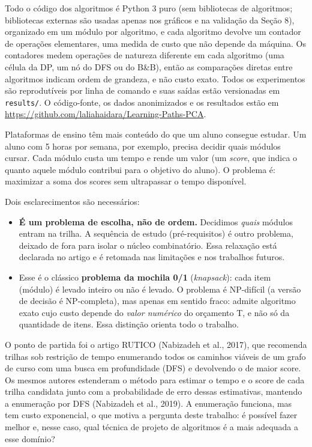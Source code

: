 \documentclass[12pt,a4paper]{article}
\newcommand{\secao}[1]{\par\vspace{1.2em}\noindent{\bfseries #1}\par\vspace{0.8em}\nopagebreak}
\begin{document}
Todo o código dos algoritmos é Python 3 puro (sem bibliotecas de algoritmos; bibliotecas externas são usadas apenas nos gráficos e na validação da Seção 8), organizado em um módulo por algoritmo, e cada algoritmo devolve um contador de operações elementares, uma medida de custo que não depende da máquina. Os contadores medem operações de natureza diferente em cada algoritmo (uma célula da DP, um nó do DFS ou do B\&B), então as comparações diretas entre algoritmos indicam ordem de grandeza, e não custo exato. Todos os experimentos são reprodutíveis por linha de comando e suas saídas estão versionadas em \texttt{results/}. O código-fonte, os dados anonimizados e os resultados estão em \url{https://github.com/laliahaidara/Learning-Paths-PCA}.

\secao{2 O PROBLEMA: ESCOLHER O QUE ESTUDAR QUANDO O TEMPO É LIMITADO}
Plataformas de ensino têm mais conteúdo do que um aluno consegue estudar. Um aluno com 5 horas por semana, por exemplo, precisa decidir quais módulos cursar. Cada módulo custa um tempo e rende um valor (um \textit{score}, que indica o quanto aquele módulo contribui para o objetivo do aluno). O problema é: maximizar a soma dos scores sem ultrapassar o tempo disponível.

Dois esclarecimentos são necessários:

\begin{itemize}[leftmargin=*,itemsep=0.3em]
\item \textbf{É um problema de escolha, não de ordem.} Decidimos \textit{quais} módulos entram na trilha. A sequência de estudo (pré-requisitos) é outro problema, deixado de fora para isolar o núcleo combinatório. Essa relaxação está declarada no artigo e é retomada nas limitações e nos trabalhos futuros.
\item Esse é o clássico \textbf{problema da mochila 0/1} (\textit{knapsack}): cada item (módulo) é levado inteiro ou não é levado. O problema é NP-difícil (a versão de decisão é NP-completa), mas apenas em sentido fraco: admite algoritmo exato cujo custo depende do \textit{valor numérico} do orçamento T, e não só da quantidade de itens. Essa distinção orienta todo o trabalho.
\end{itemize}

O ponto de partida foi o artigo RUTICO (Nabizadeh et al., 2017), que recomenda trilhas sob restrição de tempo enumerando todos os caminhos viáveis de um grafo de curso com uma busca em profundidade (DFS) e devolvendo o de maior score. Os mesmos autores estenderam o método para estimar o tempo e o score de cada trilha candidata junto com a probabilidade de erro dessas estimativas, mantendo a enumeração por DFS (Nabizadeh et al., 2019). A enumeração funciona, mas tem custo exponencial, o que motiva a pergunta deste trabalho: é possível fazer melhor e, nesse caso, qual técnica de projeto de algoritmos é a mais adequada a esse domínio?
\end{document}
